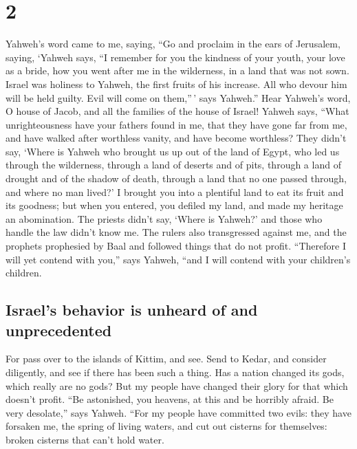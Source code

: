\hypertarget{section-1}{%
\section{2}\label{section-1}}

 Yahweh's word came to me, saying,  ``Go and
proclaim in the ears of Jerusalem, saying, `Yahweh says, ``I remember
for you the kindness of your youth, your love as a bride, how you went
after me in the wilderness, in a land that was not sown. 
Israel was holiness to Yahweh, the first fruits of his increase. All who
devour him will be held guilty. Evil will come on them,''\,' says
Yahweh.''  Hear Yahweh's word, O house of Jacob, and all
the families of the house of Israel!  Yahweh says, ``What
unrighteousness have your fathers found in me, that they have gone far
from me, and have walked after worthless vanity, and have become
worthless?  They didn't say, `Where is Yahweh who brought
us up out of the land of Egypt, who led us through the wilderness,
through a land of deserts and of pits, through a land of drought and of
the shadow of death, through a land that no one passed through, and
where no man lived?'  I brought you into a plentiful land
to eat its fruit and its goodness; but when you entered, you defiled my
land, and made my heritage an abomination.  The priests
didn't say, `Where is Yahweh?' and those who handle the law didn't know
me. The rulers also transgressed against me, and the prophets prophesied
by Baal and followed things that do not profit. 
``Therefore I will yet contend with you,'' says Yahweh, ``and I will
contend with your children's children.

\hypertarget{israels-behavior-is-unheard-of-and-unprecedented}{%
\subsection{Israel's behavior is unheard of and
unprecedented}\label{israels-behavior-is-unheard-of-and-unprecedented}}

 For pass over to the islands of Kittim, and see. Send to
Kedar, and consider diligently, and see if there has been such a thing.
 Has a nation changed its gods, which really are no gods?
But my people have changed their glory for that which doesn't profit.
 ``Be astonished, you heavens, at this and be horribly
afraid. Be very desolate,'' says Yahweh.  ``For my people
have committed two evils: they have forsaken me, the spring of living
waters, and cut out cisterns for themselves: broken cisterns that can't
hold water.

